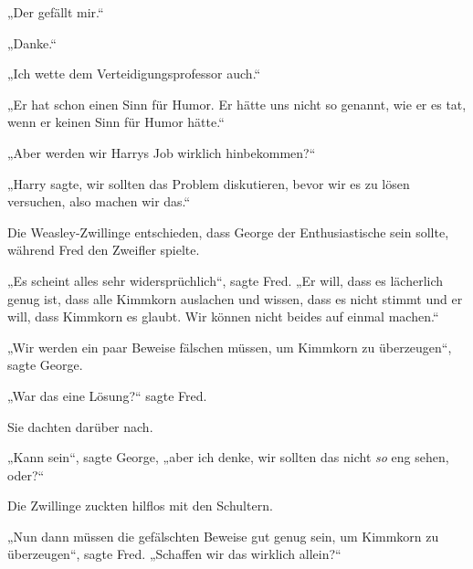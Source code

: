 „Der gefällt mir.“

„Danke.“

„Ich wette dem Verteidigungsprofessor auch.“

„Er hat schon einen Sinn für Humor. Er hätte uns nicht so genannt, wie er es tat, wenn er keinen Sinn für Humor hätte.“

„Aber werden wir Harrys Job wirklich hinbekommen?“

„Harry sagte, wir sollten das Problem diskutieren, bevor wir es zu lösen versuchen, also machen wir das.“

Die Weasley-Zwillinge entschieden, dass George der Enthusiastische sein sollte, während Fred den Zweifler spielte.

„Es scheint alles sehr widersprüchlich“, sagte Fred. „Er will, dass es lächerlich genug ist, dass alle Kimmkorn auslachen und wissen, dass es nicht stimmt und er will, dass Kimmkorn es glaubt. Wir können nicht beides auf einmal machen.“

„Wir werden ein paar Beweise fälschen müssen, um Kimmkorn zu überzeugen“, sagte George.

„War das eine Lösung?“ sagte Fred.

Sie dachten darüber nach.

„Kann sein“, sagte George, „aber ich denke, wir sollten das nicht \emph{so} eng sehen, oder?“

Die Zwillinge zuckten hilflos mit den Schultern.

„Nun dann müssen die gefälschten Beweise gut genug sein, um Kimmkorn zu überzeugen“, sagte Fred. „Schaffen wir das wirklich allein?“

